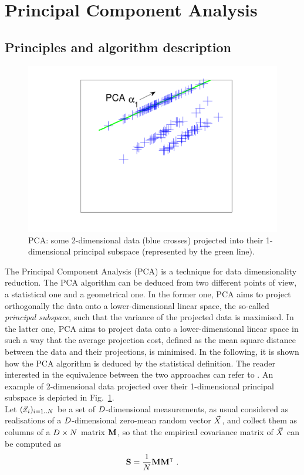 
\section{Principal Component Analysis} \label{sec:PCA}
\subsection{Principles and algorithm description}
\begin{figure}
\centering
\includegraphics[width=.5\textwidth]{../Figures/PCA_LDA_geometric/PCAprojection_unsupervised.pdf} 
\caption{PCA: some 2-dimensional data (blue crosses) projected into their 1-dimensional principal subspace (represented by the green line).}\label{fig:PCAunsupervised}
\end{figure}
The Principal Component Analysis (PCA) is a technique for data dimensionality reduction. The PCA algorithm can be deduced from two different points of view, a statistical one and a geometrical one. In the former one, PCA aims to project orthogonally the data onto a lower-dimensional linear space, the so-called \emph{principal subspace}, such that the variance of the projected data is maximised. In the latter one, PCA aims to project data onto a lower-dimensional linear space in such a way that the average projection cost, defined as the mean square distance between the data and their projections, is minimised. In the following, it is shown how the PCA algorithm is deduced by the statistical definition. The reader interested in the equivalence between the two approaches can refer to \cite[Ch.\ 12]{christopher2006pattern}. An example of 2-dimensional data projected over their 1-dimensional principal subspace is depicted in Fig.~\ref{fig:PCAunsupervised}.\\

Let $(\vec{x}_i)_{i=1..N}$ be a set of $D$-dimensional measurements, as usual considered as realisations of a $D$-dimensional zero-mean random vector $\vec{X}{}$, and collect them as columns of a $D \times N$ matrix $\textbf{M}$, so that the empirical covariance matrix of $\vec{X}{}$ can be computed as 
\begin{equation}\label{eq:covmat}
\textbf{S} = \frac{1}{N}\textbf{M}\textbf{M}^\intercal \mbox{ .}
\end{equation}

